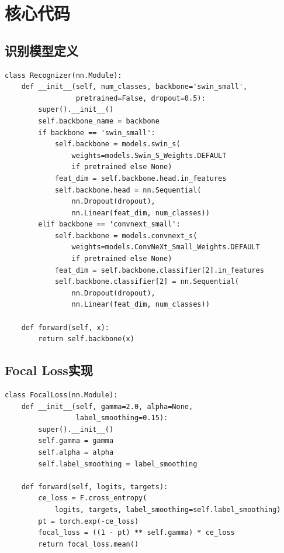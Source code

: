 \documentclass[12pt,a4paper]{article}
\begin{document}
\appendix
\section{核心代码}

\subsection{识别模型定义}
\label{code:recognizer}

\begin{lstlisting}[caption={识别模型定义}]
class Recognizer(nn.Module):
    def __init__(self, num_classes, backbone='swin_small',
                 pretrained=False, dropout=0.5):
        super().__init__()
        self.backbone_name = backbone
        if backbone == 'swin_small':
            self.backbone = models.swin_s(
                weights=models.Swin_S_Weights.DEFAULT
                if pretrained else None)
            feat_dim = self.backbone.head.in_features
            self.backbone.head = nn.Sequential(
                nn.Dropout(dropout),
                nn.Linear(feat_dim, num_classes))
        elif backbone == 'convnext_small':
            self.backbone = models.convnext_s(
                weights=models.ConvNeXt_Small_Weights.DEFAULT
                if pretrained else None)
            feat_dim = self.backbone.classifier[2].in_features
            self.backbone.classifier[2] = nn.Sequential(
                nn.Dropout(dropout),
                nn.Linear(feat_dim, num_classes))

    def forward(self, x):
        return self.backbone(x)
\end{lstlisting}

\subsection{Focal Loss实现}
\label{code:focal}

\begin{lstlisting}[caption={Focal Loss实现}]
class FocalLoss(nn.Module):
    def __init__(self, gamma=2.0, alpha=None,
                 label_smoothing=0.15):
        super().__init__()
        self.gamma = gamma
        self.alpha = alpha
        self.label_smoothing = label_smoothing

    def forward(self, logits, targets):
        ce_loss = F.cross_entropy(
            logits, targets, label_smoothing=self.label_smoothing)
        pt = torch.exp(-ce_loss)
        focal_loss = ((1 - pt) ** self.gamma) * ce_loss
        return focal_loss.mean()
\end{lstlisting}
\end{document}

